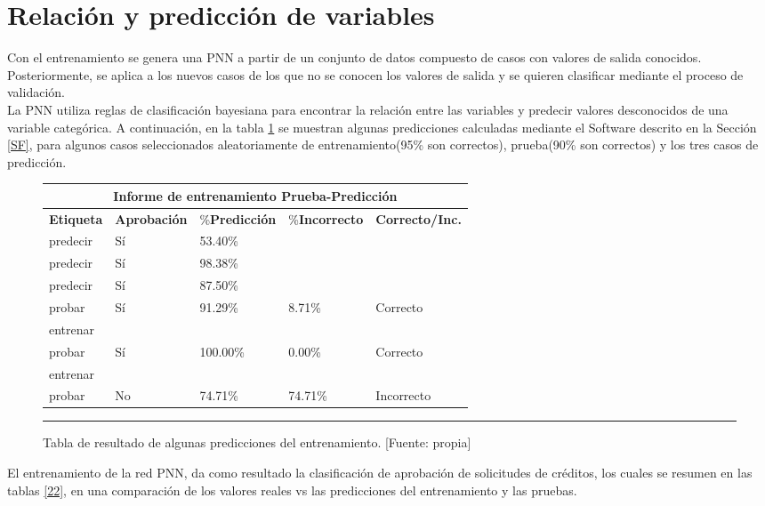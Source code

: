 \documentclass[11pt,titlepage]{report}
\begin{document}
\section{Relación y predicción de variables}
Con el entrenamiento se genera una PNN a partir de un conjunto de datos compuesto de casos con valores de salida conocidos. Posteriormente, se aplica a los nuevos casos de los que no se conocen los valores de salida y se quieren clasificar mediante el proceso de validación.\\

La PNN utiliza reglas de clasificación bayesiana para encontrar la relación entre las variables y predecir valores desconocidos de una variable categórica. A continuación, en la tabla \ref{21} se muestran algunas predicciones calculadas mediante el Software descrito en la Sección \ref{SF}, para algunos casos seleccionados aleatoriamente de entrenamiento(95\% son correctos), prueba(90\% son correctos) y los tres casos de predicción.\\

\begin{figure}[h] \centering
\begin{tabular}{| m{2cm} | m{2cm} | m{2.3cm} |m{2.3cm} | m{2.5cm} |} \hline
\multicolumn{5}{|c|}{\textbf{Informe de entrenamiento Prueba-Predicción} }\\ \hline
\textbf{Etiqueta} &	\textbf{Aprobación} & \%\textbf{Predicción} &	\%\textbf{Incorrecto}   & \textbf{Correcto/Inc.}\\ \hline
predecir&	Sí&	53.40\% & &\\ \hline		
predecir&	Sí&	98.38\% & &\\ \hline		
predecir&	Sí&	87.50\% & &\\ \hline		
probar&	Sí    &	91.29\% &	8.71\%	&Correcto\\ \hline
entrenar&     &			& &\\ \hline
probar&	Sí    &	100.00\%&	0.00\%&	Correcto\\ \hline
entrenar&     &			&  &\\ \hline
probar&	No    &	74.71\% &74.71\% &	Incorrecto\\ \hline
\end{tabular}
\caption{Tabla de resultado de algunas predicciones del entrenamiento. [Fuente: propia]\label{21}}
\hrule
\end{figure}  
El entrenamiento de la red PNN, da como resultado la clasificación de aprobación de solicitudes de créditos, los cuales se resumen en las tablas \ref{22}, en una comparación de los valores reales vs las predicciones del entrenamiento y las pruebas.
\end{document}

